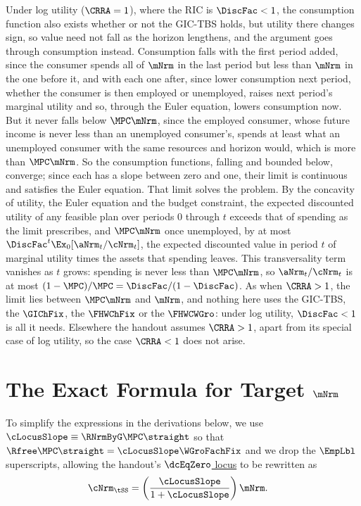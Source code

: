 \documentclass{econark}
\begin{document}
Under log utility ($\CRRA = 1$), where the RIC is $\DiscFac < 1$, the consumption function also exists whether or not the GIC-TBS holds, but utility there changes sign, so value need not fall as the horizon lengthens, and the argument goes through consumption instead.  Consumption falls with the first period added, since the consumer spends all of $\mNrm$ in the last period but less than $\mNrm$ in the one before it, and with each one after, since lower consumption next period, whether the consumer is then employed or unemployed, raises next period's marginal utility and so, through the Euler equation, lowers consumption now.  But it never falls below $\MPC\mNrm$, since the employed consumer, whose future income is never less than an unemployed consumer's, spends at least what an unemployed consumer with the same resources and horizon would, which is more than $\MPC\mNrm$.  So the consumption functions, falling and bounded below, converge; since each has a slope between zero and one, their limit is continuous and satisfies the Euler equation.  That limit solves the problem.  By the concavity of utility, the Euler equation and the budget constraint, the expected discounted utility of any feasible plan over periods $0$ through $t$ exceeds that of spending as the limit prescribes, and $\MPC\mNrm$ once unemployed, by at most $\DiscFac^{t}\Ex_{0}[\aNrm_{t}/\cNrm_{t}]$, the expected discounted value in period $t$ of marginal utility times the assets that spending leaves.  This transversality term vanishes as $t$ grows: spending is never less than $\MPC\mNrm$, so $\aNrm_{t}/\cNrm_{t}$ is at most $(1-\MPC)/\MPC = \DiscFac/(1-\DiscFac)$.  As when $\CRRA > 1$, the limit lies between $\MPC\mNrm$ and $\mNrm$, and nothing here uses the GIC-TBS, the $\GIChFix$, the $\FHWChFix$ or the $\FHWCWGro$: under log utility, $\DiscFac < 1$ is all it needs.  Elsewhere the handout assumes $\CRRA > 1$, apart from its special case of log utility, so the case $\CRRA < 1$ does not arise.


\section{The Exact Formula for Target $\mNrm$}\label{sec:mTargExact}

To simplify the expressions in the derivations below, we use $\cLocusSlope \equiv \RNrmByG \MPC \straight$ so that $\Rfree \MPC \straight = \cLocusSlope \WGroFachFix$ and we drop the $\EmpLbl$ superscripts, allowing the handout's \hyperref[eq:cDelEqZero]{$\dcEqZero$ locus} to be rewritten as 
\begin{equation}\begin{gathered}\begin{aligned}
  \cNrm_{\tSS} & =  \left(\frac{\cLocusSlope }{1+\cLocusSlope}\right)\mNrm .
\end{aligned}\end{gathered}\end{equation}
\end{document}
